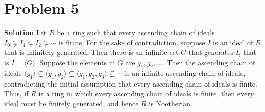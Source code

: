 \documentclass{article}
\begin{document}
\section{Problem 5}
\textbf{Solution } Let $R$ be a ring such that every ascending chain of ideals $I_0 \subsetneq I_1 \subsetneq I_2 \subsetneq \cdots $ is finite. For the sake of contradiction, suppose $I$ is an ideal of $R$ that
is infinitely generated. Then there is an infinite set $G$ that generates $I$, that is $I = \langle G \rangle$. Suppose the elements in $G$ are $g_1, g_2, \ldots $. Then the ascending chain
of ideals $ \langle g_1 \rangle \subsetneq \langle g_1, g_2 \rangle \subsetneq \langle g_1, g_2, g_3 \rangle \subsetneq \cdots$ is an infinite ascending chain of ideals, contradicting the initial assumption 
that every ascending chain of ideals is finite. Thus, if $R$ is a ring in which every ascending chain of ideals is finite, then every ideal must be finitely generated, and hence $R$ is Noetherian.
\end{document}

